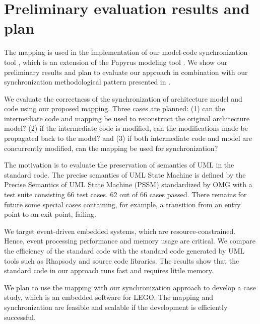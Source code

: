 \section{Preliminary evaluation results and plan}
\label{sec:evaluationplan}
The mapping is used in the implementation of our model-code synchronization tool \cite{foster2016}, which is an extension of the Papyrus modeling tool \cite{gerard201019}.
We show our preliminary results and plan to evaluate our approach in combination with our synchronization methodological pattern presented in \cite{foster2016}.

\noindent
{}
We evaluate the correctness of the synchronization of architecture model and code using our proposed mapping.
Three cases are planned: (1) can the intermediate code and mapping be used to reconstruct the original architecture model? (2) if the intermediate code is modified, can the modifications made be propagated back to the model? and (3) if both intermediate code and model are concurrently modified, can the mapping be used for synchronization?

\noindent
{}
The motivation is to evaluate the preservation of semantics of UML in the standard code.
The precise semantics of UML State Machine is defined by the Precise Semantics of UML State Machine (PSSM) \cite{PSSM} standardized by OMG with a test suite consisting 66 test cases.
62 out of 66 cases passed.
There remains for future some special cases containing, for example, a transition from an entry point to an exit point, failing.


\noindent
{}
We target event-driven embedded systems, which are resource-constrained.
Hence, event processing performance and memory usage are critical.
We compare the efficiency of the standard code with the standard code generated by UML tools such as Rhapsody and source code libraries.
The results show that the standard code in our approach runs fast and requires little memory.

\noindent
{}
We plan to use the mapping with our synchronization approach to develop a case study, which is an embedded software for LEGO.
The mapping and synchronization are feasible and scalable if the development is efficiently successful.

	
